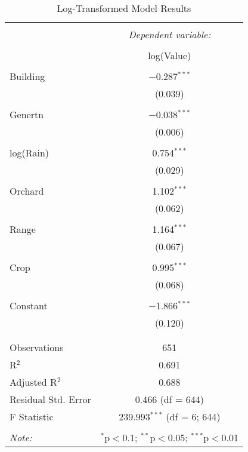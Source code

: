 
\begin{table}[!htbp] \centering 
  \caption{Log-Transformed Model Results} 
  \label{} 
\begin{tabular}{@{\extracolsep{5pt}}lc} 
\\[-1.8ex]\hline 
\hline \\[-1.8ex] 
 & \multicolumn{1}{c}{\textit{Dependent variable:}} \\ 
\cline{2-2} 
\\[-1.8ex] & log(Value) \\ 
\hline \\[-1.8ex] 
 Building & $-$0.287$^{***}$ \\ 
  & (0.039) \\ 
  & \\ 
 Genertn & $-$0.038$^{***}$ \\ 
  & (0.006) \\ 
  & \\ 
 log(Rain) & 0.754$^{***}$ \\ 
  & (0.029) \\ 
  & \\ 
 Orchard & 1.102$^{***}$ \\ 
  & (0.062) \\ 
  & \\ 
 Range & 1.164$^{***}$ \\ 
  & (0.067) \\ 
  & \\ 
 Crop & 0.995$^{***}$ \\ 
  & (0.068) \\ 
  & \\ 
 Constant & $-$1.866$^{***}$ \\ 
  & (0.120) \\ 
  & \\ 
\hline \\[-1.8ex] 
Observations & 651 \\ 
R$^{2}$ & 0.691 \\ 
Adjusted R$^{2}$ & 0.688 \\ 
Residual Std. Error & 0.466 (df = 644) \\ 
F Statistic & 239.993$^{***}$ (df = 6; 644) \\ 
\hline 
\hline \\[-1.8ex] 
\textit{Note:}  & \multicolumn{1}{r}{$^{*}$p$<$0.1; $^{**}$p$<$0.05; $^{***}$p$<$0.01} \\ 
\end{tabular} 
\end{table} 

